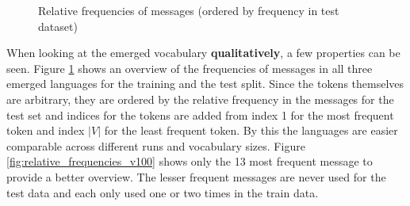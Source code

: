 \begin{figure}[ht]
    \centering
    \caption{Relative frequencies of messages (ordered by frequency in test dataset)}
    \label{fig:relative_frequencies_vocabularies}
\end{figure}

When looking at the emerged vocabulary \textbf{qualitatively}, a few properties can be seen.
Figure \ref{fig:relative_frequencies_vocabularies} shows an overview of the frequencies of messages in all three emerged languages for the training and the test split.
Since the tokens themselves are arbitrary, they are ordered by the relative frequency in the messages for the test set and indices for the tokens are added from index 1 for the most frequent token and index $|V|$ for the least frequent token.
By this the languages are easier comparable across different runs and vocabulary sizes.
Figure \ref{fig:relative_frequencies_v100} shows only the 13 most frequent message to provide a better overview.
The lesser frequent messages are never used for the test data and each only used one or two times in the train data.


